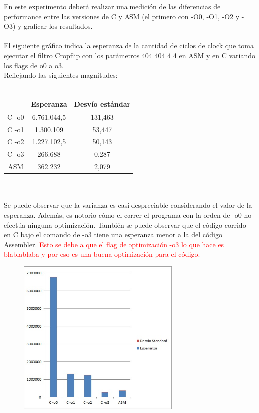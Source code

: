 En este experimento deberá realizar una medición de las diferencias de 
performance entre las versiones de C y ASM (el primero con -O0, -O1, -O2 y -O3) 
y graficar los resultados. \\
\\
El siguiente gr\'afico indica la esperanza de la cantidad de ciclos de clock que toma ejecutar el filtro Cropflip con los par\'ametros 404 404 4 4 en ASM y en C variando los flags de o0 a o3. \\
Reflejando las siguientes magnitudes: \\
\\
 \begin{tabular}[c]{|c|c|c|}
	\hline
		 & Esperanza & Desv\'io est\'andar\\
		\hline
C -o0 & 6.761.044,5 & 131,463 \\
\hline
C -o1 & 1.300.109 & 53,447 \\
\hline
C -o2 & 1.227.102,5 & 50,143\\
\hline
C -o3 & 266.688 & 0,287 \\
\hline
ASM & 362.232 & 2,079\\
\hline
	\end{tabular}\\\\


Se puede observar que la varianza es casi despreciable considerando el valor de la esperanza. Adem\'as, es notorio c\'omo el correr el programa con la orden de -o0 no efect\'ua ninguna optimizaci\'on. Tambi\'en se puede observar que el c\'odigo corrido en C bajo el comando de -o3 tiene una esperanza menor a la del c\'odigo Assembler. \textcolor{red}{Esto se debe a que el flag de optimizaci\'on -o3 lo que hace es blablablaba y por eso es una buena optimizaci\'on para el c\'odigo.}


\begin{figure}[h!]
  \begin{center}
	\includegraphics[width=0.7\textwidth]{imagenes/14.jpg}
  \end{center}
\end{figure}
\newpage

